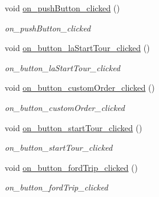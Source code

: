 \begin{DoxyCompactItemize}
\mbox{\label{class_tour_a9ba9d8b20e2bfdf58aa0388524f4c2a5}} 
void \hyperlink{class_tour_a9ba9d8b20e2bfdf58aa0388524f4c2a5}{on\+\_\+push\+Button\+\_\+clicked} ()
\begin{DoxyCompactList}\small\item\em on\+\_\+push\+Button\+\_\+clicked \end{DoxyCompactList}\item 
\mbox{\label{class_tour_a87899e7bf32ab3e1c408f68c879ae8f4}} 
void \hyperlink{class_tour_a87899e7bf32ab3e1c408f68c879ae8f4}{on\+\_\+button\+\_\+la\+Start\+Tour\+\_\+clicked} ()
\begin{DoxyCompactList}\small\item\em on\+\_\+button\+\_\+la\+Start\+Tour\+\_\+clicked \end{DoxyCompactList}\item 
\mbox{\label{class_tour_ac02c49de0a8a708077b16a4fbbd1b0fe}} 
void \hyperlink{class_tour_ac02c49de0a8a708077b16a4fbbd1b0fe}{on\+\_\+button\+\_\+custom\+Order\+\_\+clicked} ()
\begin{DoxyCompactList}\small\item\em on\+\_\+button\+\_\+custom\+Order\+\_\+clicked \end{DoxyCompactList}\item 
\mbox{\label{class_tour_a727b42b7d283f6e9565ec4c1830f9436}} 
void \hyperlink{class_tour_a727b42b7d283f6e9565ec4c1830f9436}{on\+\_\+button\+\_\+start\+Tour\+\_\+clicked} ()
\begin{DoxyCompactList}\small\item\em on\+\_\+button\+\_\+start\+Tour\+\_\+clicked \end{DoxyCompactList}\item 
\mbox{\label{class_tour_ac3aab61b46810cdfadcc90d404a8baa7}} 
void \hyperlink{class_tour_ac3aab61b46810cdfadcc90d404a8baa7}{on\+\_\+button\+\_\+ford\+Trip\+\_\+clicked} ()
\begin{DoxyCompactList}\small\item\em on\+\_\+button\+\_\+ford\+Trip\+\_\+clicked \end{DoxyCompactList}\end{DoxyCompactItemize}
